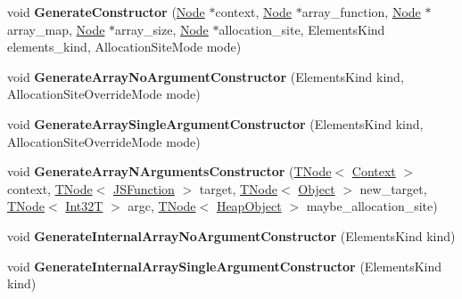 \begin{DoxyCompactItemize}
\item 
\mbox{\label{classv8_1_1internal_1_1ArrayBuiltinsAssembler_acd67e2232ff1a27a0e2d0267584886f8}} 
void {\bfseries Generate\+Constructor} (\mbox{\hyperlink{classv8_1_1internal_1_1compiler_1_1Node}{Node}} $\ast$context, \mbox{\hyperlink{classv8_1_1internal_1_1compiler_1_1Node}{Node}} $\ast$array\+\_\+function, \mbox{\hyperlink{classv8_1_1internal_1_1compiler_1_1Node}{Node}} $\ast$array\+\_\+map, \mbox{\hyperlink{classv8_1_1internal_1_1compiler_1_1Node}{Node}} $\ast$array\+\_\+size, \mbox{\hyperlink{classv8_1_1internal_1_1compiler_1_1Node}{Node}} $\ast$allocation\+\_\+site, Elements\+Kind elements\+\_\+kind, Allocation\+Site\+Mode mode)
\item 
\mbox{\label{classv8_1_1internal_1_1ArrayBuiltinsAssembler_af336cad9031dfd2d34fdbdcabd80fecf}} 
void {\bfseries Generate\+Array\+No\+Argument\+Constructor} (Elements\+Kind kind, Allocation\+Site\+Override\+Mode mode)
\item 
\mbox{\label{classv8_1_1internal_1_1ArrayBuiltinsAssembler_abbeeb46f99db6215b7c0aa75cc259af4}} 
void {\bfseries Generate\+Array\+Single\+Argument\+Constructor} (Elements\+Kind kind, Allocation\+Site\+Override\+Mode mode)
\item 
\mbox{\label{classv8_1_1internal_1_1ArrayBuiltinsAssembler_a0465b4fd3538f98a03981f404f461e0a}} 
void {\bfseries Generate\+Array\+N\+Arguments\+Constructor} (\mbox{\hyperlink{classv8_1_1internal_1_1compiler_1_1TNode}{T\+Node}}$<$ \mbox{\hyperlink{classv8_1_1internal_1_1Context}{Context}} $>$ context, \mbox{\hyperlink{classv8_1_1internal_1_1compiler_1_1TNode}{T\+Node}}$<$ \mbox{\hyperlink{classv8_1_1internal_1_1JSFunction}{J\+S\+Function}} $>$ target, \mbox{\hyperlink{classv8_1_1internal_1_1compiler_1_1TNode}{T\+Node}}$<$ \mbox{\hyperlink{classv8_1_1internal_1_1Object}{Object}} $>$ new\+\_\+target, \mbox{\hyperlink{classv8_1_1internal_1_1compiler_1_1TNode}{T\+Node}}$<$ \mbox{\hyperlink{structv8_1_1internal_1_1Int32T}{Int32T}} $>$ argc, \mbox{\hyperlink{classv8_1_1internal_1_1compiler_1_1TNode}{T\+Node}}$<$ \mbox{\hyperlink{classv8_1_1internal_1_1HeapObject}{Heap\+Object}} $>$ maybe\+\_\+allocation\+\_\+site)
\item 
\mbox{\label{classv8_1_1internal_1_1ArrayBuiltinsAssembler_a383e2d99d3b9a6f614a2b26e4b962dda}} 
void {\bfseries Generate\+Internal\+Array\+No\+Argument\+Constructor} (Elements\+Kind kind)
\item 
\mbox{\label{classv8_1_1internal_1_1ArrayBuiltinsAssembler_aec1d1f2c0b3b6cdfa681b8880bfa2f86}} 
void {\bfseries Generate\+Internal\+Array\+Single\+Argument\+Constructor} (Elements\+Kind kind)
\end{DoxyCompactItemize}
